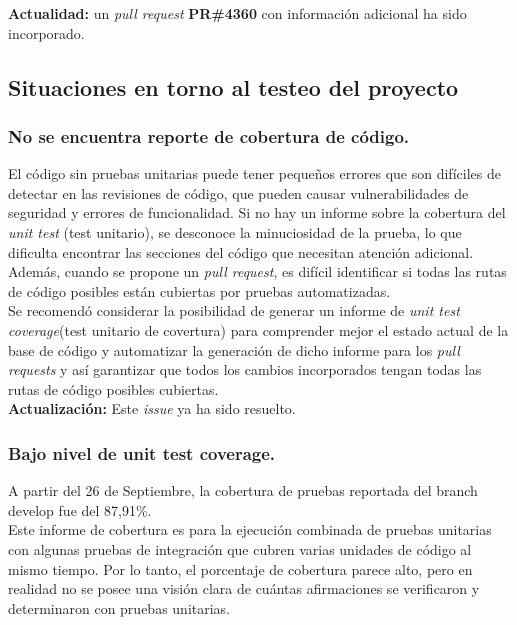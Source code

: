 \textbf{Actualidad:} un \textit{pull request} \textbf{PR\#4360}\cite{GHPR4360} con información adicional ha sido incorporado.\\

\subsection{Situaciones en torno al testeo del proyecto}

\subsubsection{No se encuentra reporte de cobertura de código.}

El código sin pruebas unitarias puede tener pequeños errores que son difíciles de detectar en las revisiones de código, que pueden causar vulnerabilidades de seguridad y errores de funcionalidad. Si no hay un informe sobre la cobertura del \textit{unit test} (test unitario), se desconoce la minuciosidad de la prueba, lo que dificulta encontrar las secciones del código que necesitan atención adicional. Además, cuando se propone un \textit{pull request}, es difícil identificar si todas las rutas de código posibles están cubiertas por pruebas automatizadas.\\

Se recomendó considerar la posibilidad de generar un informe de \textit{unit test coverage}(test unitario de covertura) para comprender mejor el estado actual de la base de código y automatizar la generación de dicho informe para los \textit{pull requests} y así garantizar que todos los cambios incorporados tengan todas las rutas de código posibles cubiertas.\\

\textbf{Actualización:} Este \textit{issue}\cite{GHI2663} ya ha sido resuelto.\\

\subsubsection{Bajo nivel de unit test coverage.}

A partir del 26 de Septiembre, la cobertura de pruebas reportada del branch develop\cite{CodeCovEthereumSolidityOld} fue del 87,91\%.\\

Este informe de cobertura es para la ejecución combinada de pruebas unitarias con algunas pruebas de integración que cubren varias unidades de código al mismo tiempo. Por lo tanto, el porcentaje de cobertura parece alto, pero en realidad no se posee una visión clara de cuántas afirmaciones se verificaron y determinaron con pruebas unitarias.\\

